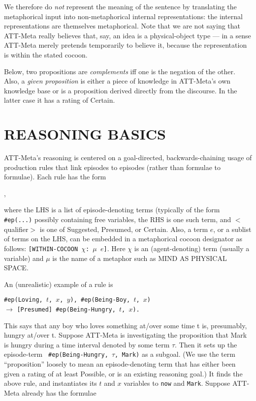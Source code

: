 We therefore do {\it not} represent the meaning of the sentence by translating
the metaphorical input into non-metaphorical internal representations: the
internal representations are themselves metaphorical.  Note that we are not
saying that ATT-Meta really believes that, say, an idea is a physical-object
type --- in a sense ATT-Meta merely pretends temporarily to believe it, because
the representation is within the stated cocoon.

Below, two propositions are {\it complements} iff one is the negation of the
other.  Also, a {\it given proposition} is either a piece of knowledge in
ATT-Meta's own knowledge base or is a proposition derived directly from the
discourse.  In the latter case it has a rating of Certain.


\section{REASONING BASICS} %

ATT-Meta's reasoning is centered on a goal-directed, backwards-chaining usage
of production rules that link episodes to episodes (rather than formulae to
formulae).  Each rule has the form 

, 

where the LHS is a list of episode-denoting terms (typically of the form {\tt
\#ep(...)} possibly containing free variables, the RHS is one such term, and $<$qualifier$>$ is
one of Suggested, Presumed, or Certain. Also, a term $e$, or
a sublist of terms on the LHS, can be embedded in a metaphorical cocoon
designator as follows: {\tt [WITHIN-COCOON $\chi$: $\mu$ $e$]}. Here $\chi$ is
an (agent-denoting) term (usually a variable) and $\mu$ is the name of a
metaphor such as MIND AS PHYSICAL SPACE.

An (unrealistic) example of a  rule is

\begin{tabbing}
\quad \={\tt \#ep(Loving, $t$, $x$, $y$), \#ep(Being-Boy, $t$, $x$)}\\
      \>$\longrightarrow$ {\tt [Presumed] \#ep(Being-Hungry, $t$, $x$).}
\end{tabbing}

\noindent
This says that any boy who loves something at/over some time t is, presumably, hungry at/over t. Suppose ATT-Meta is investigating the proposition
that Mark is hungry during a time interval denoted by some term $\tau$.
Then it sets up the episode-term {\tt
\#ep(Being-Hungry, $\tau$, Mark)} as a subgoal.  (We use the term
``proposition'' loosely to mean an episode-denoting term that has either been
given a rating of at least Possible, or is an existing reasoning goal.)  It
finds the above rule, and instantiates its $t$ and $x$ variables to {\tt now}
and {\tt Mark}.  Suppose ATT-Meta already has the formulae

